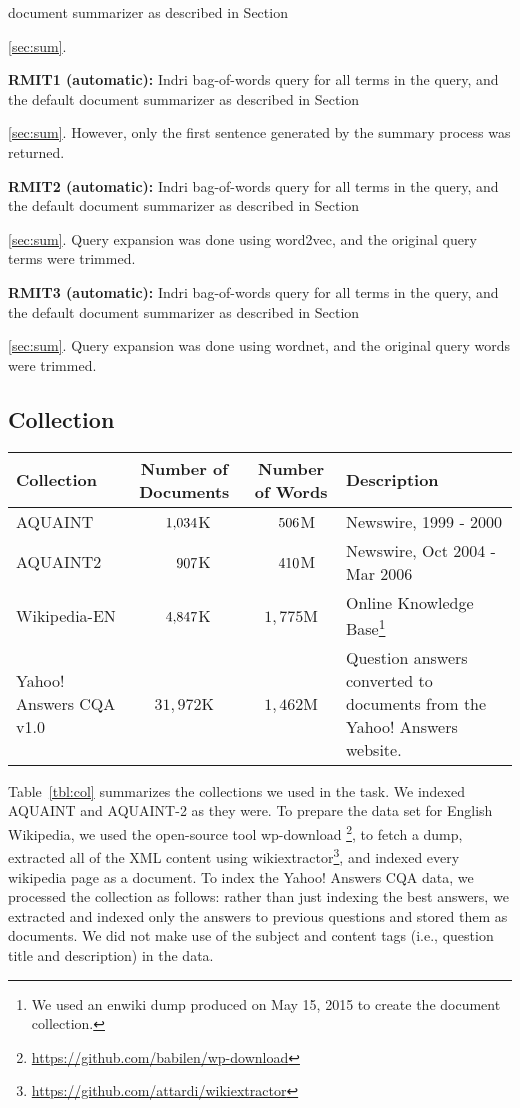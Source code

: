 \documentclass[a4paper,10pt,conference,compsocconf,final]{IEEEtran}
\newcommand\method[1]{{\sf\small{#1}}}
\def\D{\hphantom{1}}
\def\C{\hphantom{1,}}
\begin{document}
document summarizer as described in Section~{\ref{sec:sum}.

\medskip

\noindent\textbf{RMIT1 (automatic): }
Indri bag-of-words query for all terms in the query, and the default
document summarizer as described in Section~{\ref{sec:sum}.
However, only the first sentence generated by the summary process
was returned.

\medskip

\noindent\textbf{RMIT2 (automatic): }
Indri bag-of-words query for all terms in the query, and the default
document summarizer as described in Section~{\ref{sec:sum}.
Query expansion was done using \method{word2vec}, and the original query terms were trimmed.

\medskip

\noindent\textbf{RMIT3 (automatic): }
Indri bag-of-words query for all terms in the query, and the default
document summarizer as described in Section~{\ref{sec:sum}.
Query expansion was done using \method{wordnet}, and the original query words were trimmed.

\medskip


\subsection{Collection}

\begin{table*}[!t]
\centering
\caption{Summary of collections indexed to answer questions.\label{tbl:col}}
\begin{tabular}{p{35mm}ccp{50mm}}
\toprule
{\bf Collection} & {\bf Number of Documents} & {\bf Number of Words} & {\bf Description} \\
\midrule
AQUAINT & $\D1{,}034$K & $\C506$M & Newswire, 1999 - 2000 \\
AQUAINT2 & $\D\C907$K & $\C410$M & Newswire, Oct 2004 - Mar 2006 \\
Wikipedia-EN & $\D4{,}847$K & $1{,}775$M & Online Knowledge Base\footnote{We used an enwiki dump produced on May 15, 2015 to create the document collection.} \\
Yahoo! Answers CQA v1.0 & $31{,}972$K & $1{,}462$M & Question answers converted to documents from the Yahoo! Answers website.
\\
\bottomrule
\end{tabular}
\end{table*}

Table~{\ref{tbl:col}} summarizes the collections we used in the task.  We
indexed AQUAINT and AQUAINT-2 as they were.  To prepare the data set for
English Wikipedia, we used the open-source tool {\method{wp-download}}
\footnote{\url{https://github.com/babilen/wp-download}}, to fetch a dump, extracted
all of the XML content using
{\method{wikiextractor}}\footnote{\url{https://github.com/attardi/wikiextractor}},
and indexed every wikipedia page as a document.  To index the Yahoo!  Answers
CQA data, we processed the collection as follows: rather than just indexing the
best answers, we extracted and indexed only the answers to previous questions
and stored them as documents.  We did not make use of the subject and content
tags (i.e., question title and description) in the data.  

}}}}
\end{document}
